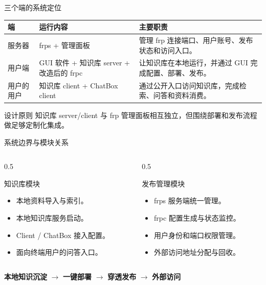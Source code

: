 \documentclass[aspectratio=169]{beamer}
\newcommand{\keypoint}[1]{\textcolor{whu}{\textbf{#1}}}
\begin{document}
\begin{frame}{三个端的系统定位}
    \small
    \begin{tabularx}{\textwidth}{>{\raggedright\arraybackslash}p{}X X}
        \toprule
        \textbf{端} & \textbf{运行内容} & \textbf{主要职责} \\
        \midrule
        服务器 & frps + 管理面板 & 管理 frp 连接端口、用户账号、发布状态和访问入口。 \\
        用户端 & GUI 软件 + 知识库 server + 改造后的 frpc & 让知识库在本地运行，并通过 GUI 完成配置、部署、发布。 \\
        用户的用户 & 知识库 client + ChatBox client & 通过公开入口访问知识库，完成检索、问答和资料消费。 \\
        \bottomrule
    \end{tabularx}

    \vspace{0.4cm}
    \begin{block}{设计原则}
        知识库 server/client 与 frp 管理面板相互独立，但围绕部署和发布流程做足够定制化集成。
    \end{block}
\end{frame}

\begin{frame}{系统边界与模块关系}
    \begin{columns}[T]
        \begin{column}{0.5\textwidth}
            \begin{block}{知识库模块}
                \begin{itemize}
                    \item 本地资料导入与索引。
                    \item 本地知识库服务启动。
                    \item Client / ChatBox 接入配置。
                    \item 面向终端用户的问答入口。
                \end{itemize}
            \end{block}
        \end{column}
        \begin{column}{0.5\textwidth}
            \begin{block}{发布管理模块}
                \begin{itemize}
                    \item frps 服务端统一管理。
                    \item frpc 配置生成与状态监控。
                    \item 用户身份和端口权限管理。
                    \item 外部访问地址分配与回收。
                \end{itemize}
            \end{block}
        \end{column}
    \end{columns}

    \vspace{0.35cm}
    \centering
    \keypoint{本地知识沉淀} $\rightarrow$ \keypoint{一键部署} $\rightarrow$ \keypoint{穿透发布} $\rightarrow$ \keypoint{外部访问}
\end{frame}
\end{document}
